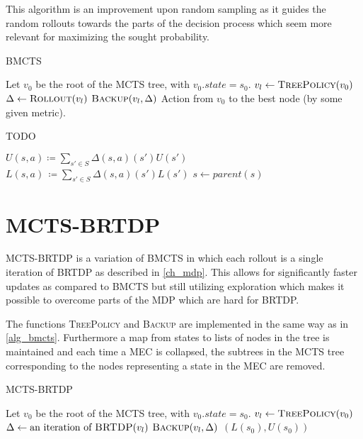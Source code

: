 This algorithm is an improvement upon random sampling as it guides the
random rollouts towards the parts of the decision process which seem
more relevant for maximizing the sought probability.

\begin{algorithm}
\caption{BMCTS}
\label{alg_bmcts}
\begin{algorithmic}
    \State Let $v_0$ be the root of the MCTS tree, with $v_0.state = s_0$.
        \State $v_l \gets \Call{TreePolicy}{v_0}$
        \State $\Delta \gets \Call{Rollout}{v_l}$
        \State $\Call{Backup}{v_l, \Delta}$
    \EndWhile
    \State \Return Action from $v_0$ to the best node (by some
    given metric).
\EndFunction

TODO
\EndFunction

\Repeat
{}
\EndFunction

\Repeat
    \State $U(s,a) \coloneqq \sum_{s' \in S} \Delta(s,a)(s')U(s')$
    \State $L(s,a)\, \coloneqq \sum_{s' \in S} \Delta(s,a)(s')L(s')$
    \State $s \gets parent(s)$
\EndFunction
\end{algorithmic}
\end{algorithm}

\section{MCTS-BRTDP}

MCTS-BRTDP is a variation of BMCTS in which each rollout is a
single iteration of BRTDP as described in \autoref{ch_mdp}. This allows
for significantly faster updates as compared to BMCTS but still
utilizing exploration which makes it possible to overcome parts of the
MDP which are hard for BRTDP.

The functions \textsc{TreePolicy} and \textsc{Backup} are implemented in
the same way as in \autoref{alg_bmcts}. Furthermore a map from states to
lists of nodes in the tree is maintained and each time a MEC is
collapsed, the subtrees in the MCTS tree corresponding to the nodes
representing a state in the MEC are removed.

\begin{algorithm}
\caption{MCTS-BRTDP}
\label{mcts-brtdp}
\begin{algorithmic}
    \State Let $v_0$ be the root of the MCTS tree, with $v_0.state = s_0$.
        \State $v_l \gets \Call{TreePolicy}{v_0}$
        \State $\Delta \gets \text{an iteration of } \Call{BRTDP}{v_l}$
        \State $\Call{Backup}{v_l, \Delta}$
    \EndWhile
    \State \Return $(L(s_0), U(s_0))$
\EndFunction

\end{algorithmic}
\end{algorithm}



